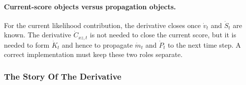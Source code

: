 \documentclass[11pt]{article}
\numberwithin{equation}{section}
\begin{document}
\paragraph{Current-score objects versus propagation objects.}
For the current likelihood contribution, the derivative closes once
\(\dot v_t\) and \(\dot S_t\) are known.  The derivative
\(\dot C_{xz,t}\) is not needed to close the current score, but it is needed to
form \(\dot K_t\) and hence to propagate \(\dot m_t\) and \(\dot P_t\) to the next
time step.  A correct implementation must keep these two roles separate.

\subsubsection{The Story Of The Derivative}
\label{subsec:p32-gradient-story}
\end{document}
